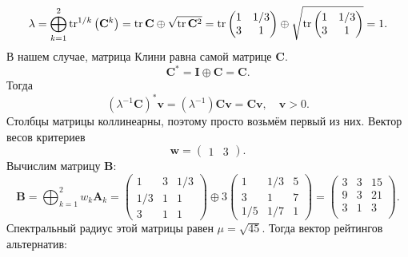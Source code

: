 \documentclass[specialist,
	substylefile = spbu.rtx,
	subf,href,colorlinks=true, 12pt]{disser}
\begin{document}
\[
	\lambda=\bigoplus_{k=1}^{2} \operatorname{tr}^{1 / k}\left(\mathbf{C}^{k}\right) = \operatorname{tr}\mathbf{C} \oplus \sqrt{\operatorname{tr}\mathbf{C}^2} =
	\operatorname{tr}\begin{pmatrix}1&1/3\\3&1\end{pmatrix} \oplus \sqrt{\operatorname{tr}\begin{pmatrix}1&1/3\\3&1\end{pmatrix}} = 1.
\]
В нашем случае, матрица Клини равна самой матрице \(\mathbf{C}\).
\[
	\mathbf{C}^* = \mathbf{I} \oplus \mathbf{C} = \mathbf{C}.
\]
Тогда
\[
	(\lambda^{-1}\mathbf{C})^*\mathbf{v} = (\lambda^{-1})\mathbf{C}\mathbf{v} = \mathbf{C}\mathbf{v}, \quad \mathbf{v} > 0.
\]
Столбцы матрицы коллинеарны, поэтому просто возьмём первый из них. Вектор весов критериев
\[
	\mathbf{w} = \begin{pmatrix}1 & 3\end{pmatrix}.
\]
Вычислим матрицу \(\mathbf{B}\):
\[
	\mathbf{B}=\bigoplus_{k=1}^{2} w_{k} \mathbf{A}_{k} = \begin{pmatrix}1&3&1/3\\1/3&1&1\\3&1&1\end{pmatrix} \oplus 3\begin{pmatrix}1&1/3&5\\3&1&7\\1/5&1/7&1\end{pmatrix} = \begin{pmatrix}3&3&15\\ 9&3&21\\ 3&1&3\\\end{pmatrix}.
\]
Спектральный радиус этой матрицы равен \(\mu = \sqrt{45}\).
Тогда вектор рейтингов альтернатив:
\end{document}
